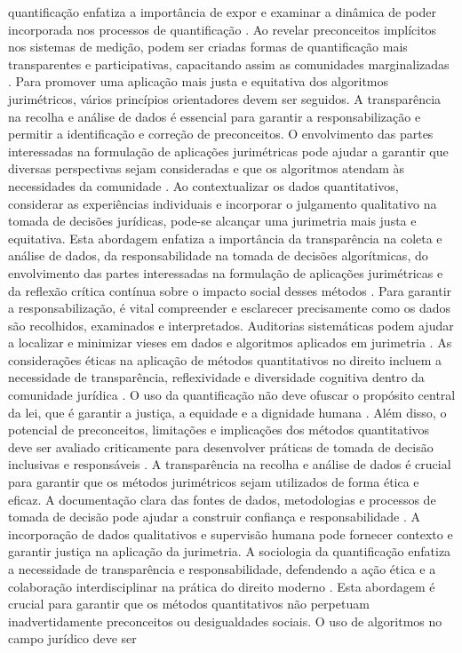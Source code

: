 \begin{agradecimentos}
quantificação enfatiza a importância de expor e examinar a dinâmica de poder incorporada nos processos de quantificação \cite{10.1057/s41599-020-00557-0,10.1080/07329113.2015.1046739}. Ao revelar preconceitos implícitos nos sistemas de medição, podem ser criadas formas de quantificação mais transparentes e participativas, capacitando assim as comunidades marginalizadas \cite{10.1057/s41599-020-00557-0,10.1080/07329113.2015.1046739}. Para promover uma aplicação mais justa e equitativa dos algoritmos jurimétricos, vários princípios orientadores devem ser seguidos. A transparência na recolha e análise de dados é essencial para garantir a responsabilização e permitir a identificação e correção de preconceitos. O envolvimento das partes interessadas na formulação de aplicações jurimétricas pode ajudar a garantir que diversas perspectivas sejam consideradas e que os algoritmos atendam às necessidades da comunidade \cite{10.1590/dados.2022.65.3.267}. Ao contextualizar os dados quantitativos, considerar as experiências individuais e incorporar o julgamento qualitativo na tomada de decisões jurídicas, pode-se alcançar uma jurimetria mais justa e equitativa. Esta abordagem enfatiza a importância da transparência na coleta e análise de dados, da responsabilidade na tomada de decisões algorítmicas, do envolvimento das partes interessadas na formulação de aplicações jurimétricas e da reflexão crítica contínua sobre o impacto social desses métodos \cite{10.1590/dados.2022.65.3.267}. Para garantir a responsabilização, é vital compreender e esclarecer precisamente como os dados são recolhidos, examinados e interpretados. Auditorias sistemáticas podem ajudar a localizar e minimizar vieses em dados e algoritmos aplicados em jurimetria \cite{10.1590/dados.2022.65.3.267,inthelawviewmetadatacitationsimilarpapers2014}. As considerações éticas na aplicação de métodos quantitativos no direito incluem a necessidade de transparência, reflexividade e diversidade cognitiva dentro da comunidade jurídica \cite{silva2023role,nunes2016jurimetria}. O uso da quantificação não deve ofuscar o propósito central da lei, que é garantir a justiça, a equidade e a dignidade humana \cite{silva2023role,nunes2016jurimetria}. Além disso, o potencial de preconceitos, limitações e implicações dos métodos quantitativos deve ser avaliado criticamente para desenvolver práticas de tomada de decisão inclusivas e responsáveis \cite{silva2023role,nunes2016jurimetria}. A transparência na recolha e análise de dados é crucial para garantir que os métodos jurimétricos sejam utilizados de forma ética e eficaz. A documentação clara das fontes de dados, metodologias e processos de tomada de decisão pode ajudar a construir confiança e responsabilidade \cite{unger2021process}. A incorporação de dados qualitativos e supervisão humana pode fornecer contexto e garantir justiça na aplicação da jurimetria. A sociologia da quantificação enfatiza a necessidade de transparência e responsabilidade, defendendo a ação ética e a colaboração interdisciplinar na prática do direito moderno \cite{10.1007/s11186-021-09453-1,salais2016quantification}. Esta abordagem é crucial para garantir que os métodos quantitativos não perpetuam inadvertidamente preconceitos ou desigualdades sociais. O uso de algoritmos no campo jurídico deve ser 
\end{agradecimentos}
